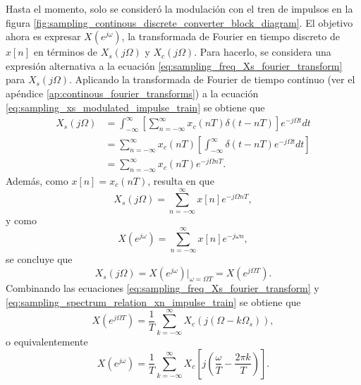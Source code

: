 \documentclass[a4paper]{report}
\begin{document}
Hasta el momento, solo se consideró la modulación con el tren de impulsos en la figura \ref{fig:sampling_continous_discrete_converter_block_diagram}. El objetivo ahora es expresar \(X(e^{j\omega})\), la transformada de Fourier en tiempo discreto de \(x[n]\) en términos de \(X_s(j\Omega)\) y \(X_c(j\Omega)\). Para hacerlo, se considera una expresión alternativa a la ecuación \ref{eq:sampling_freq_Xs_fourier_transform} para \(X_s(j\Omega)\).  Aplicando la transformada de Fourier de tiempo continuo (ver el apéndice \ref{ap:continous_fourier_transforms}) a la ecuación \ref{eq:sampling_xs_modulated_impulse_train} se obtiene que 
\begin{align*}
 X_s(j\Omega)&=\int_{-\infty}^{\infty}\left[\sum_{n=-\infty}^{\infty}x_c(nT)\delta(t-nT)\right]e^{-j\Omega t}dt\\
  &=\sum_{n=-\infty}^{\infty}x_c(nT)\left[\int_{-\infty}^{\infty}\delta(t-nT)e^{-j\Omega t}dt\right]\\
  &=\sum_{n=-\infty}^{\infty}x_c(nT)e^{-j\Omega nT}.
\end{align*}
Además, como \(x[n]=x_c(nT)\), resulta en que
\[
 X_s(j\Omega)=\sum_{n=-\infty}^{\infty}x[n]e^{-j\Omega nT},
\]
y como
\[
 X(e^{j\omega})=\sum_{n=-\infty}^{\infty}x[n]e^{-j\omega n},
\]
se concluye que 
\begin{equation}\label{eq:sampling_spectrum_relation_xn_impulse_train}
 X_s(j\Omega)=X(e^{j\omega})\big|_{\omega=\Omega T}=X(e^{j\Omega T}).
\end{equation}
Combinando las ecuaciones \ref{eq:sampling_freq_Xs_fourier_transform} y \ref{eq:sampling_spectrum_relation_xn_impulse_train} se obtiene que
\begin{equation}\label{eq:sampling_spectrum_relation_xn_impulse_train_XjOmegaT}
 X(e^{j\Omega T})=\frac{1}{T}\sum_{k=-\infty}^{\infty}X_c(j(\Omega-k\Omega_s)), 
\end{equation}
o equivalentemente
\begin{equation}\label{eq:sampling_spectrum_relation_xn_impulse_train_Xjw}
 X(e^{j\omega})=\frac{1}{T}\sum_{k=-\infty}^{\infty}X_c\left[j\left(\frac{\omega}{T}-\frac{2\pi k}{T}\right)\right]. 
\end{equation}
\end{document}
